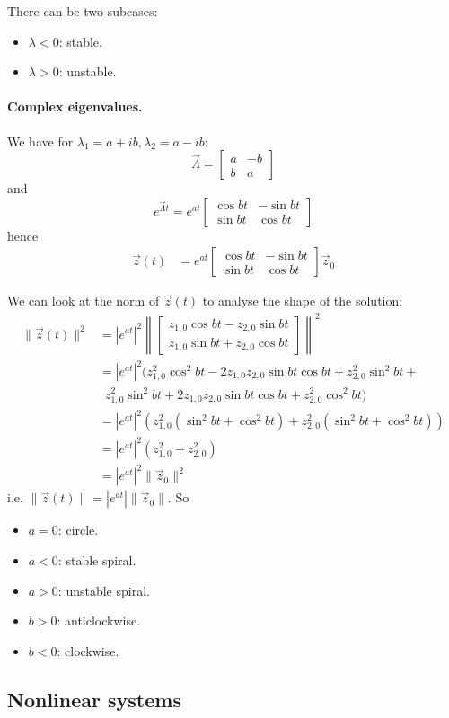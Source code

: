 There can be two subcases:
\begin{itemize}
	\item $\lambda < 0$: stable.
	\item $\lambda > 0$: unstable.
\end{itemize}

\paragraph{Complex eigenvalues.} We have for $\lambda_1 = a + ib, \lambda_2 = a - ib$:
\begin{equation*}
	\vec \Lambda = 
	\begin{bmatrix}
		a & -b \\
		b & a
	\end{bmatrix}
\end{equation*}
and
\begin{equation*}
	e^{\vec \Lambda t} =
		e^{at}
		\begin{bmatrix}
			\cos{bt}	& -\sin{bt} \\
			\sin{bt}	& \cos{bt}
		\end{bmatrix}
\end{equation*}
hence
\begin{align*}
	\vec z(t) 	&= 
		e^{at}
		\begin{bmatrix}
			\cos{bt}	& -\sin{bt} \\
			\sin{bt}	& \cos{bt}
		\end{bmatrix}
		\vec z_0
\end{align*}

We can look at the norm of $\vec z(t)$ to analyse the shape of the solution:
\begin{align*}
	\| \vec z(t) \|^2	&= |e^{at}|^2 \left\|
							\begin{bmatrix}
								z_{1, 0}\cos{bt} - z_{2, 0}\sin{bt} \\
								z_{1, 0}\sin{bt} + z_{2, 0}\cos{bt}
							\end{bmatrix} \right\|^2 \\
						&= |e^{at}|^2 (z_{1, 0}^2\cos^2{bt} - 2z_{1, 0}z_{2, 0}\sin{bt}\cos{bt} + z_{2, 0}^2\sin^2{bt} + \\
							&\,\,\,z_{1, 0}^2\sin^2{bt} + 2z_{1, 0}z_{2, 0}\sin{bt}\cos{bt} + z_{2, 0}^2\cos^2{bt}) \\
						&= |e^{at}|^2 (z_{1, 0}^2 (\sin^2{bt} + \cos^2{bt}) + z_{2, 0}^2 (\sin^2{bt} + \cos^2{bt})) \\
						&= |e^{at}|^2 (z_{1, 0}^2 + z_{2, 0}^2) \\
						&= |e^{at}|^2 \| \vec z_0 \|^2
\end{align*}
i.e. $\|\vec z(t)\| = |e^{at}| \|\vec z_0\|$. So
\begin{itemize}
	\item $a = 0$: circle.
	\item $a < 0$: stable spiral.
	\item $a > 0$: unstable spiral.
	\item $b > 0$: anticlockwise.
	\item $b < 0$: clockwise.
\end{itemize}

\subsection{Nonlinear systems}
